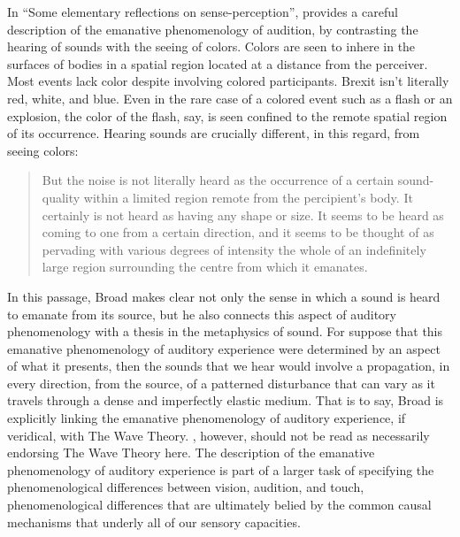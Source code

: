 In ``Some elementary reflections on sense-perception'', \citet{Broad:1952kx} provides a careful description of the emanative phenomenology of audition, by contrasting the hearing of sounds with the seeing of colors. Colors are seen to inhere in the surfaces of bodies in a spatial region located at a distance from the perceiver. Most events lack color despite involving colored participants. Brexit isn't literally red, white, and blue. Even in the rare case of a colored event such as a flash or an explosion, the color of the flash, say, is seen confined to the remote spatial region of its occurrence. Hearing sounds are crucially different, in this regard, from seeing colors:
\begin{quote}
	But the noise is not literally heard as the occurrence of a certain sound-quality within a limited region remote from the percipient's body. It certainly is not heard as having any shape or size. It seems to be heard as coming to one from a certain direction, and it seems to be thought of as pervading with various degrees of intensity the whole of an indefinitely large region surrounding the centre from which it emanates. \citep[5]{Broad:1952kx}
\end{quote}
In this passage, Broad makes clear not only the sense in which a sound is heard to emanate from its source, but he also connects this aspect of auditory phenomenology with a thesis in the metaphysics of sound. For suppose that this emanative phenomenology of auditory experience were determined by an aspect of what it presents, then the sounds that we hear would involve a propagation, in every direction, from the source, of a patterned disturbance that can vary as it travels through a dense and imperfectly elastic medium. That is to say, Broad is explicitly linking the emanative phenomenology of auditory experience, if veridical, with The Wave Theory. \citet{Broad:1952kx}, however, should not be read as necessarily endorsing The Wave Theory here. The description of the emanative phenomenology of auditory experience is part of a larger task of specifying the phenomenological differences between vision, audition, and touch, phenomenological differences that are ultimately belied by the common causal mechanisms that underly all of our sensory capacities.

